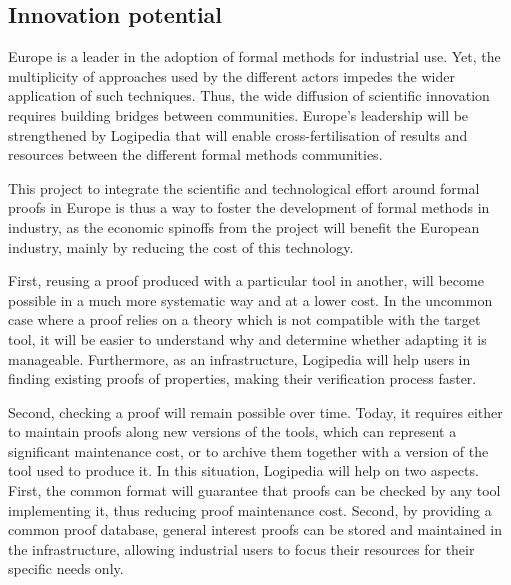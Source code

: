 \subsection*{Innovation potential}

Europe is a leader in the adoption of formal methods for
industrial use. Yet, the multiplicity of approaches used by the
different actors impedes the wider application of such
techniques. Thus, the wide diffusion of scientific innovation requires
building bridges between communities. Europe's leadership will be
strengthened by Logipedia that will enable cross-fertilisation of
results and resources between the different formal methods
communities.

This project to integrate the scientific and technological effort
around formal proofs in Europe is thus a way to foster the development
of formal methods in industry, as the economic spinoffs from the
project will benefit the European industry, mainly by reducing the
cost of this technology. 

First, reusing a proof produced with a particular tool in another, 
will become possible in a much more systematic way and at a
lower cost. In the uncommon case where a proof relies on a theory
which is not compatible with the target tool, it will be easier to
understand why and determine whether adapting it is manageable.
Furthermore, as an infrastructure, Logipedia will help users
in finding existing proofs of properties, making their verification
process faster.

Second, checking a proof will remain possible over time. Today, it
requires either to maintain proofs along new versions of the tools,
which can represent a significant maintenance cost, or to archive
them together with a version of the tool used to produce it. In this
situation, Logipedia will help on two aspects. First, the
common format will guarantee that proofs can be checked by any tool
implementing it, thus reducing proof maintenance cost. Second, by
providing a common proof database, general interest proofs can be
stored and maintained in the infrastructure, allowing industrial users
to focus their resources for their specific needs only.

